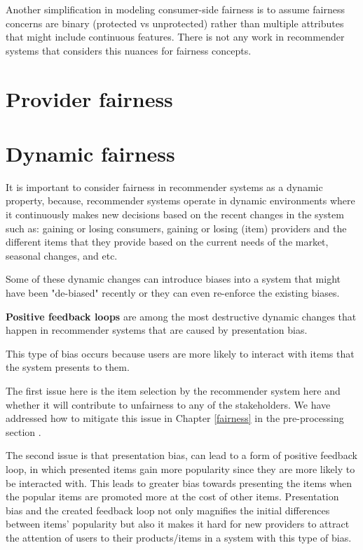     Another simplification in modeling consumer-side fairness is to assume fairness concerns are binary (protected vs unprotected) rather than multiple attributes that might include continuous features. There is not any work in recommender systems that considers this nuances for fairness concepts.


\section{Provider fairness}

\section{Dynamic fairness}

    It is important to consider fairness in recommender systems as a dynamic property, because, recommender systems operate in dynamic environments where it continuously makes new decisions based on the recent changes in the system such as: gaining or losing consumers, gaining or losing (item) providers and the different items that they provide based on the current needs of the market, seasonal changes, and etc.

    Some of these dynamic changes can introduce biases into a system that might have been "de-biased" recently or they can even re-enforce the existing biases. 
    
    \textbf{Positive feedback loops} are among the most destructive dynamic changes that happen in recommender systems \cite{o2016weapons} that are caused by presentation bias.
    
    This type of bias occurs because users are more likely to interact with items that the system presents to them. 
    
    The first issue here is the item selection by the recommender system here and whether it will contribute to unfairness to any of the stakeholders. We have addressed how to mitigate this issue in Chapter \ref{fairness} in the pre-processing section . 
    
    The second issue is that presentation bias, can lead to a form of positive feedback loop, in which presented items gain more popularity since they are more likely to be interacted with. This leads to greater bias towards presenting the items when the popular items are promoted more at the cost of other items. Presentation bias and the created feedback loop not only magnifies the initial differences between items' popularity but also it makes it hard for new providers to attract the attention of users to their products/items in a system with this type of bias.
    

